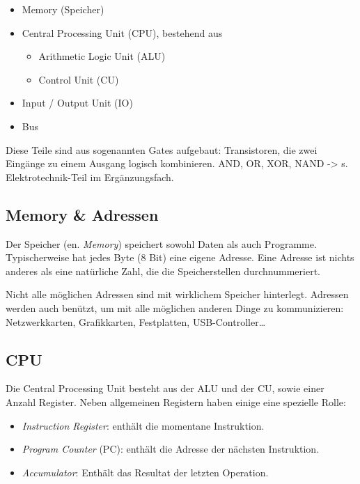 \begin{itemize}
    \item Memory (Speicher)
    \item Central Processing Unit (CPU), bestehend aus
        \begin{itemize}
            \item Arithmetic Logic Unit (ALU)
            \item Control Unit (CU)
        \end{itemize}
    \item Input / Output Unit (IO)
    \item Bus
\end{itemize}

Diese Teile sind aus sogenannten Gates aufgebaut: Transistoren,
die zwei Eingänge zu einem Ausgang logisch kombinieren.
AND, OR, XOR, NAND -> s. Elektrotechnik-Teil im Ergänzungsfach.

\subsection{Memory \& Adressen}

Der Speicher (en. \emph{Memory}) speichert sowohl Daten als auch Programme. Typischerweise hat jedes Byte (8 Bit) eine eigene Adresse. Eine Adresse ist nichts anderes als eine natürliche Zahl, die die Speicherstellen durchnummeriert.


Nicht alle möglichen Adressen sind mit wirklichem Speicher hinterlegt. Adressen werden auch benützt, um mit alle möglichen anderen Dinge zu kommunizieren: Netzwerkkarten, Grafikkarten, Festplatten, USB-Controller…

\subsection{CPU}

Die Central Processing Unit besteht aus der ALU und der CU, sowie einer Anzahl Register. Neben allgemeinen Registern haben einige eine spezielle Rolle:
\begin{itemize}
	\item \emph{Instruction Register}: enthält die momentane Instruktion.
	\item \emph{Program Counter} (PC): enthält die Adresse der nächsten Instruktion.
	\item \emph{Accumulator}: Enthält das Resultat der letzten Operation.
\end{itemize}

